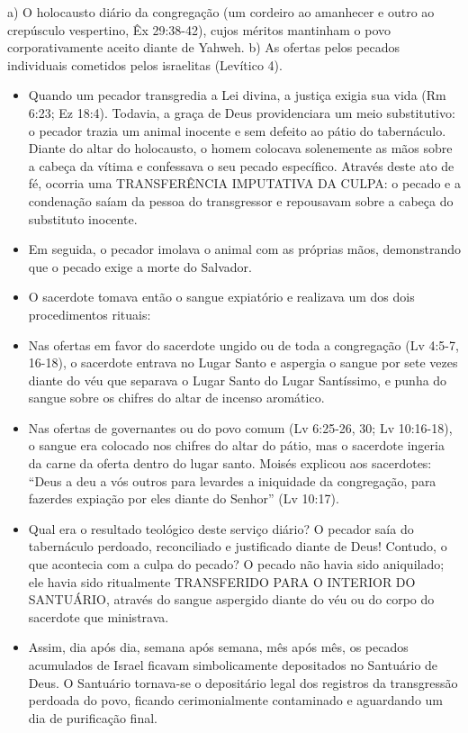 \documentclass[11pt,a4paper,openany]{book}
\begin{document}
a) O holocausto diário da congregação (um cordeiro ao amanhecer e outro ao crepúsculo vespertino, Êx 29:38-42), cujos méritos mantinham o povo corporativamente aceito diante de Yahweh.
b) As ofertas pelos pecados individuais cometidos pelos israelitas (Levítico 4).
\begin{itemize}
  \item Quando um pecador transgredia a Lei divina, a justiça exigia sua vida (Rm 6:23; Ez 18:4). Todavia, a graça de Deus providenciara um meio substitutivo: o pecador trazia um animal inocente e sem defeito ao pátio do tabernáculo. Diante do altar do holocausto, o homem colocava solenemente as mãos sobre a cabeça da vítima e confessava o seu pecado específico. Através deste ato de fé, ocorria uma TRANSFERÊNCIA IMPUTATIVA DA CULPA: o pecado e a condenação saíam da pessoa do transgressor e repousavam sobre a cabeça do substituto inocente.
  \item Em seguida, o pecador imolava o animal com as próprias mãos, demonstrando que o pecado exige a morte do Salvador.
  \item O sacerdote tomava então o sangue expiatório e realizava um dos dois procedimentos rituais:
  \item Nas ofertas em favor do sacerdote ungido ou de toda a congregação (Lv 4:5-7, 16-18), o sacerdote entrava no Lugar Santo e aspergia o sangue por sete vezes diante do véu que separava o Lugar Santo do Lugar Santíssimo, e punha do sangue sobre os chifres do altar de incenso aromático.
  \item Nas ofertas de governantes ou do povo comum (Lv 6:25-26, 30; Lv 10:16-18), o sangue era colocado nos chifres do altar do pátio, mas o sacerdote ingeria da carne da oferta dentro do lugar santo. Moisés explicou aos sacerdotes: ``Deus a deu a vós outros para levardes a iniquidade da congregação, para fazerdes expiação por eles diante do Senhor'' (Lv 10:17).
  \item Qual era o resultado teológico deste serviço diário? O pecador saía do tabernáculo perdoado, reconciliado e justificado diante de Deus! Contudo, o que acontecia com a culpa do pecado? O pecado não havia sido aniquilado; ele havia sido ritualmente TRANSFERIDO PARA O INTERIOR DO SANTUÁRIO, através do sangue aspergido diante do véu ou do corpo do sacerdote que ministrava.
  \item Assim, dia após dia, semana após semana, mês após mês, os pecados acumulados de Israel ficavam simbolicamente depositados no Santuário de Deus. O Santuário tornava-se o depositário legal dos registros da transgressão perdoada do povo, ficando cerimonialmente contaminado e aguardando um dia de purificação final.
\end{itemize}
\end{document}
